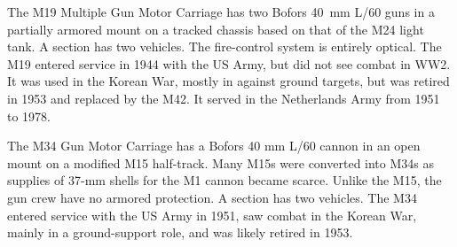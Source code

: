 
The M19 Multiple Gun Motor Carriage has two Bofors 40~mm L/60 guns in a partially armored mount on a tracked chassis based on that of the M24 light tank.
A section has two vehicles.
The fire-control system is entirely optical.
The M19 entered service in 1944 with the US Army, but did not see combat in WW2. It was used in the Korean War, mostly in against ground targets, but was retired in 1953 and replaced by the M42. It served in the Netherlands Army from 1951 to 1978.%


The M34 Gun Motor Carriage has a Bofors 40 mm L/60 cannon in an open mount on a modified M15 half-track.
Many M15s were converted into M34s as supplies of 37-mm shells for the M1 cannon became scarce. Unlike the M15, the gun crew have no armored protection.
A section has two vehicles.
The M34 entered service with the US Army in 1951, saw combat in the Korean War, mainly in a ground-support role, and was likely retired in 1953.%


